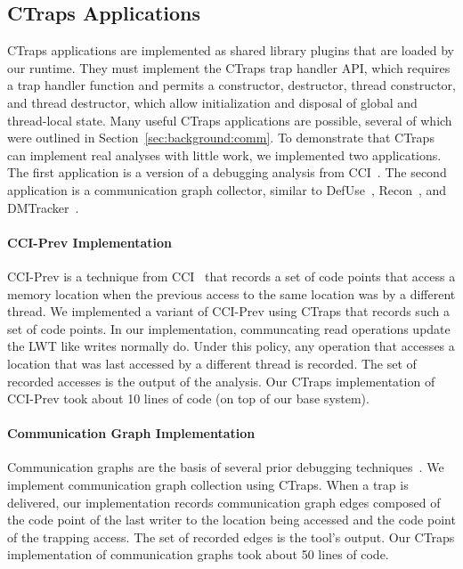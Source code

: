 \documentclass[preprint,10pt]{sigplanconf}
\newcommand{\ctraps}{CTraps\xspace}
\begin{document}
\subsection{\ctraps Applications}
\label{sec:apps}
\ctraps applications are implemented as shared library plugins that are loaded
by our runtime.  They must implement the \ctraps trap handler API, which
requires a trap handler function and permits a constructor, destructor, thread
constructor, and thread destructor, which allow initialization and disposal of
global and thread-local state.  Many useful \ctraps applications are possible,
several of which were outlined in Section~\ref{sec:background:comm}.    To
demonstrate that \ctraps can implement real analyses with little work, we
implemented two applications. The first application is a version of a debugging
analysis from CCI~\cite{cci}.  The second application is a communication graph
collector, similar to DefUse~\cite{defuse}, Recon~\cite{recon}, and
DMTracker~\cite{dmtracker}.

\paragraph{CCI-Prev Implementation}
CCI-Prev is a technique from CCI~\cite{cci} that records a set of code points
that access a memory location when the previous access to the same location was
by a different thread.  We implemented a variant of CCI-Prev using \ctraps that
records such a set of code points.  In our implementation, communcating read
operations update the LWT like writes normally do.  Under this policy, any
operation that accesses a location that was last accessed by a different thread
is recorded.  The set of recorded accesses is the output of the analysis.  Our
\ctraps implementation of CCI-Prev took about 10 lines of code (on top of our
base system). 

\paragraph{Communication Graph Implementation}
Communication graphs are the basis of several prior debugging
techniques~\cite{recon, bugaboo, defuse}.  We implement communication graph
collection using \ctraps.  When a trap is delivered, our implementation records
communication graph edges composed of the code point of the last writer to the
location being accessed and the code point of the trapping access.  The set of
recorded edges is the tool's output.  Our \ctraps implementation of
communication graphs took about 50 lines of code. 
\end{document}

